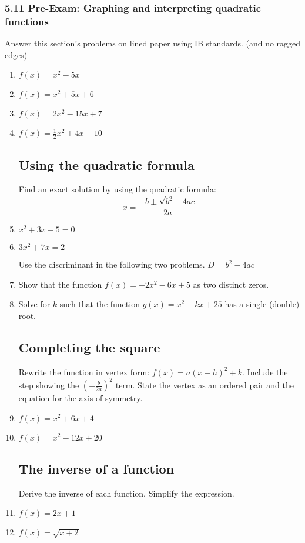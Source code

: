 \documentclass[12pt, twoside]{article}
\begin{document}
    \subsubsection*{5.11 Pre-Exam: Graphing and interpreting quadratic functions}
    Answer this section's problems on lined paper using IB standards. (and no ragged edges)
    
    
    \begin{enumerate}
    
    \item   $f(x)=x^2-5x$
    \item   $f(x)=x^2+5x+6$
    \item   $f(x)=2x^2-15x+7$
    \item   $f(x)=\frac{1}{2}x^2+4x-10$
    
    \subsection*{Using the quadratic formula}
    
    Find an exact solution by using the quadratic formula: 
    \[x=\frac{-b \pm \sqrt{b^2-4ac}}{2a}\]
    \item   $x^2+3x-5=0$
    \item   $3x^2+7x = 2$
    
    Use the discriminant in the following two problems. $D=b^2-4ac$ 
    \item Show that the function $f(x)=-2x^2-6x+5$ as two distinct zeros.
    \item Solve for $k$ such that the function $g(x)=x^2-kx+25$ has a single (double) root.
    
    \subsection*{Completing the square}
    
    Rewrite the function in vertex form: $f(x)=a(x-h)^2+k$. Include the step showing the $(-\frac{b}{2a})^2$ term. State the vertex as an ordered pair and the equation for the axis of symmetry.
    \item   $f(x)=x^2+6x+4$
    \item   $f(x)=x^2-12x+20$
    
    \subsection*{The inverse of a function}
    Derive the inverse of each function. Simplify the expression.
    \item   $f(x)=2x+1$
    \item   $f(x)=\sqrt{x+2}$
    

\end{enumerate}
\end{document}
